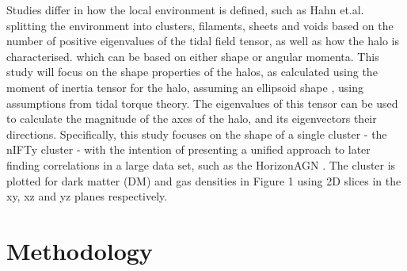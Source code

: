 \documentclass[journal]{IEEEtran}
\begin{document}
 Studies differ in how the local environment is defined, such as Hahn et.al. splitting the environment into clusters, filaments, sheets and voids based on the number of positive eigenvalues of the tidal field tensor, as well as how the halo is characterised. which can be based on either shape or angular momenta. This study will focus on the shape properties of the halos, as calculated using the moment of inertia tensor for the halo, assuming an ellipsoid shape \cite{porciani02a}, using assumptions from tidal torque theory. The eigenvalues of this tensor can be used to calculate the magnitude of the axes of the halo, and its eigenvectors their directions. Specifically, this study focuses on the shape of a single cluster - the nIFTy cluster \cite{nifty}- with the intention of presenting a unified approach to later finding correlations in a large data set, such as the HorizonAGN \cite{dubois14}. The cluster is plotted for dark matter (DM) and gas densities in Figure 1 using 2D slices in the xy, xz and yz planes respectively. 

\section{Methodology}
\end{document}
